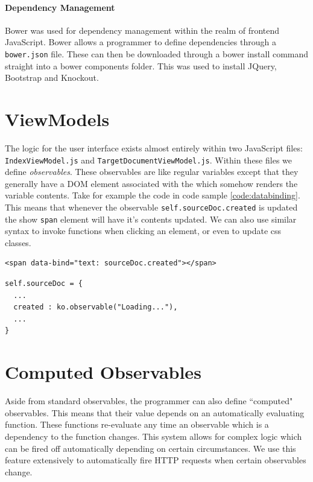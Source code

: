 \documentclass{l4proj}
\newcommand{\code}[1]{\texttt{#1}}
\newenvironment{codelisting}{\captionsetup{type=listing}}{}
\begin{document}
\paragraph{Dependency Management}
Bower was used for dependency management within the realm of frontend JavaScript. Bower allows a programmer to define dependencies through a \code{bower.json} file. These can then be downloaded through a bower install command straight into a bower components folder. This was used to install JQuery, Bootstrap and Knockout.

\section{ViewModels}
The logic for the user interface exists almost entirely within two JavaScript files: \code{IndexViewModel.js} and \code{TargetDocumentViewModel.js}. Within these files we define \textit{observables}. These observables are like regular variables except that they generally have a DOM element associated with the which somehow renders the variable contents.
Take for example the code in code sample \ref{code:databinding}. This means that whenever the observable \code{self.sourceDoc.created} is updated the show \code{span} element will have it's contents updated. We can also use similar syntax to invoke functions when clicking an element, or even to update css classes.
\begin{codelisting}
\begin{verbatim}
<span data-bind="text: sourceDoc.created"></span>
\end{verbatim}
\begin{verbatim}
self.sourceDoc = {
  ...
  created : ko.observable("Loading..."),
  ...
}
\end{verbatim}
\label{code:databinding}
\end{codelisting}

\section{Computed Observables}
Aside from standard observables, the programmer can also define ``computed" observables. This means that their value depends on an automatically evaluating function. These functions re-evaluate any time an observable which is a dependency to the function changes. This system allows for complex logic which can be fired off automatically depending on certain circumstances.
We use this feature extensively to automatically fire HTTP requests when certain observables change.
\end{document}
